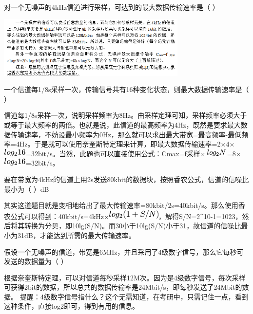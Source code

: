 \question 对一个无噪声的4kHz信道进行采样，可达到的最大数据传输速率是（ ）
\par{}
\begin{solution}\includegraphics[width=3.70833in,height=1.21875in]{computerassets/B0AE585B95CFFFFD9D175FCB4B196857.png}
\end{solution}
\question 一个信道每1/8s采样一次，传输信号共有16种变化状态，则最大数据传输速率是（
）
\par{}
\begin{solution}信道每1/8s采样一次，说明采样频率为8Hz。由采样定理可知，采样频率必须大于或等于最大频率的两倍。也就是说，此信道的最高频率为4Hz，既然是要求最大数据传输速率，不妨设最小频率为0Hz，那么就可以求出最大带宽=最高频率-最低频率=4Hz。于是就可以使用奈奎斯特定理来计算，即最大数据传输速率=2×4×\includegraphics[width=0.46875in,height=0.15625in]{texmath/8d88685Cdpi7B3507Dlog_216}=32bit/s。当然，此题也可以直接使用公式：Cmax=f采样×\includegraphics[width=0.45833in,height=0.14583in]{texmath/b7c31d5Cdpi7B3507Dlog_2N}=8×\includegraphics[width=0.46875in,height=0.15625in]{texmath/8d88685Cdpi7B3507Dlog_216}=32bit/s。
\end{solution}
\question 要在带宽为4kHz的信道上用2s发送80kbit的数据块，按照香农公式，信道的信噪比最小为（
）dB
\par{}
\begin{solution}其实这道题目就是变相地给出了最大传输速率=80kbit/2s=40kbit/s。那么使用香农公式可以得到：40kbit/s=4kHz×\includegraphics[width=1.05208in,height=0.18750in]{texmath/07e0fd5Cdpi7B3507Dlog_22812BS2FN29}，解得S/N=2\^{}10-1=1023，然后将其转换为分贝，即10lg(S/N)。而30小于10lg(S/N)小于31，故信道的信噪比最小为31dB，才能达到所需的最大传输速率。
\end{solution}
\question 假设一个无噪声的信道，带宽是6MHz，并且采用了4级数字信号，那么它每秒可发送的数据量为（
）
\par{}
\begin{solution}根据奈奎斯特定理，可以对信道每秒采样12M次。因为是4级数字信号，每次采样可获得2bit的数据，所以总共的数据传输率是24Mbit/s，即每秒发送了24Mbit的数据。
提醒：4级数字信号指什么？这个无需知道，在考研中，只需记住一点，看到这种条件，直接log2即可，得到有用的信息。
\end{solution}
